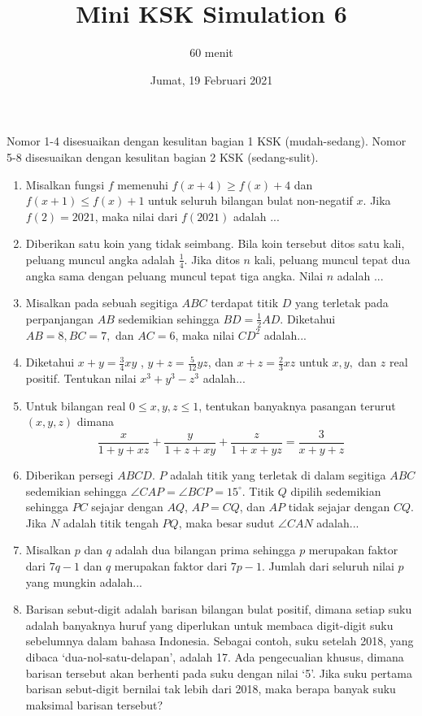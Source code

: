 \documentclass{article}
\title{Mini KSK Simulation 6}
\author{60 menit}
\date{Jumat, 19 Februari 2021}
\begin{document}
	\maketitle
	
	Nomor 1-4 disesuaikan dengan kesulitan bagian 1 KSK (mudah-sedang). Nomor 5-8 disesuaikan dengan kesulitan bagian 2 KSK (sedang-sulit).
	\begin{enumerate}
		\item
		Misalkan fungsi $f$ memenuhi $f(x+4) \ge f(x) +4$ dan $f(x+1) \le f(x)+1$ untuk seluruh bilangan bulat non-negatif $x$. Jika $f(2) = 2021$, maka nilai dari $f(2021)$ adalah ...
		
		\item
		Diberikan satu koin yang tidak seimbang. Bila koin tersebut ditos satu kali, peluang muncul angka
		adalah $\frac14$. Jika ditos $n$ kali, peluang muncul tepat dua angka sama dengan peluang muncul tepat tiga
		angka. Nilai $n$ adalah ...
		
		\item
		Misalkan pada sebuah segitiga $ABC$ terdapat titik $D$ yang terletak pada perpanjangan $AB$ sedemikian sehingga $BD = \frac12 AD$. Diketahui $AB = 8, BC=7,$ dan $AC = 6$, maka nilai $CD^2$ adalah...
		
		\item
		Diketahui $x+y=\frac34 xy$ , $y+z=\frac{5}{12}yz$, dan $x+z=\frac23xz$ untuk $x,y,$ dan $z$ real positif. Tentukan nilai $x^3+y^3-z^3$ adalah...
		
		\item
		Untuk bilangan real $0\le x,y,z \le 1$, tentukan banyaknya pasangan terurut $(x,y,z)$ dimana $$\frac{x}{1+y+xz} + \frac{y}{1+z+xy}+\frac{z}{1+x+yz}=\frac{3}{x+y+z}$$
		
		\item
		Diberikan persegi $ABCD$. $P$ adalah titik yang terletak di dalam segitiga $ABC$ sedemikian sehingga $\angle CAP = \angle BCP = 15^\circ$. Titik $Q$ dipilih sedemikian sehingga $PC$ sejajar dengan $AQ$, $AP=CQ$, dan $AP$ tidak sejajar dengan $CQ$. Jika $N$ adalah titik tengah $PQ$, maka besar sudut $\angle CAN$ adalah...
		
		\item
		Misalkan $p$ dan $q$ adalah dua bilangan prima sehingga $p$ merupakan faktor dari $7q-1$ dan $q$ merupakan faktor dari $7p-1$. Jumlah dari seluruh nilai $p$ yang mungkin adalah...
		
		\item
		Barisan sebut-digit adalah barisan bilangan bulat positif, dimana
		setiap suku adalah banyaknya huruf yang diperlukan untuk membaca
		digit-digit suku sebelumnya dalam bahasa Indonesia. Sebagai contoh,
		suku setelah 2018, yang dibaca ‘dua-nol-satu-delapan’, adalah 17.
		Ada pengecualian khusus, dimana barisan tersebut akan berhenti pada
		suku dengan nilai ‘5’.
		Jika suku pertama barisan sebut-digit bernilai tak lebih dari 2018, maka
		berapa banyak suku maksimal barisan tersebut?
	\end{enumerate}
		
\end{document}
